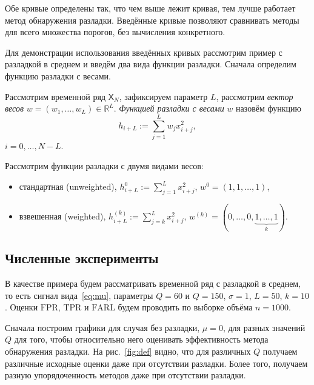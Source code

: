 \documentclass{math-mech-sci}
\newcommand{\X}{\mathsf X}
\newcommand{\FPR}{\mathrm{FPR}}
\newcommand{\TPR}{\mathrm{TPR}}
\newcommand{\FARL}{\mathrm{FARL}}
\begin{document}
Обе кривые определены так, что чем выше лежит кривая, тем лучше работает метод обнаружения разладки. Введённые кривые позволяют сравнивать методы для всего множества порогов, без вычисления конкретного.
	
Для демонстрации использования введённых кривых рассмотрим пример с разладкой в среднем и введём два вида функции разладки. Сначала определим функцию разладки с весами.
	
 Рассмотрим временной ряд $\X_N$, зафиксируем параметр $L$, рассмотрим \textit{вектор весов} $w=(w_1,\ldots,w_L)\in\mathbb R^L$. \textit{Функцией разладки с весами} $w$ назовём функцию
	\begin{equation*}
		h_{i+L}:=\sum\limits_{j=1}^Lw_jx_{i+j}^2,
	\end{equation*}
	$i=0,\ldots,N-L$.

Рассмотрим функции разладки с двумя видами весов:
	\begin{itemize}
		\item стандартная (unweighted), $h_{i+L}^0:=\sum\limits_{j=1}^Lx_{i+j}^2$, $w^0=(1,1,\ldots,1)$,
		\item взвешенная (weighted), $h_{i+L}^{(k)}:=\sum\limits_{j=k}^Lx_{i+j}^2$, $w^{(k)}=(0,\ldots,0,\underbrace{1,\ldots,1}_{k})$.
	\end{itemize}


\subsection{Численные эксперименты}
В качестве примера будем рассматривать временной ряд с разладкой в среднем, то есть сигнал вида~\eqref{eq:mu}, параметры $Q=60$ и $Q =150$, $\sigma=1$, $L=50$, $k=10$. Оценки $\FPR$, $\TPR$ и $\FARL$ будем проводить по выборке объёма $n=1000$.

Сначала построим графики для случая без разладки, $\mu=0$, для разных значений $Q$ для того, чтобы относительно него оценивать эффективность метода обнаружения разладки. На рис.~\ref{fig:def} видно, что для различных $Q$ получаем различные исходные оценки даже при отсутствии разладки. Более того, получаем разную упорядоченность методов даже при отсутствии разладки.
\end{document}
